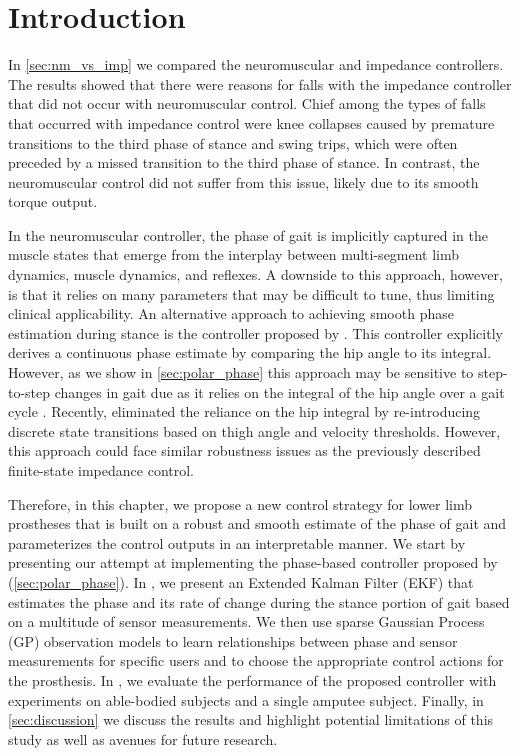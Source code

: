 \section{Introduction}

In \cref{sec:nm_vs_imp} we compared the neuromuscular and impedance controllers.
The results showed that there were reasons for falls with the impedance
controller that did not occur with neuromuscular control. Chief among the types
of falls that occurred with impedance control were knee collapses caused by
premature transitions to the third phase of stance and swing trips, which were
often preceded by a missed transition to the third phase of stance. In contrast,
the neuromuscular control did not suffer from this issue, likely due to its
smooth torque output.

In the neuromuscular controller, the phase of gait is implicitly captured in the
muscle states that emerge from the interplay between multi-segment limb
dynamics, muscle dynamics, and reflexes. A downside to this approach, however,
is that it relies on many parameters that may be difficult to tune, thus
limiting clinical applicability. An alternative approach to achieving smooth
phase estimation during stance is the controller proposed by
\citet{quintero2016preliminary}. This controller explicitly derives a continuous
phase estimate by comparing the hip angle to its integral. However, as we show
in \cref{sec:polar_phase} this approach may be sensitive to step-to-step changes
in gait due as it relies on the integral of the hip angle over a gait cycle .
Recently, \citet{rezazadeh2018phase} eliminated the reliance on the hip integral
by re-introducing discrete state transitions based on thigh angle and velocity
thresholds. However, this approach could face similar robustness issues as the
previously described finite-state impedance control.

Therefore, in this chapter, we propose a new control strategy for lower limb
prostheses that is built on a robust and smooth estimate of the phase of gait
and parameterizes the control outputs in an interpretable manner. We start by
presenting our attempt at implementing the phase-based controller proposed by
\citet{quintero2016preliminary} (\cref{sec:polar_phase}). In ,
we present an Extended Kalman Filter (EKF) that estimates the phase and its rate
of change during the stance portion of gait based on a multitude of sensor
measurements.  We then use sparse Gaussian Process (GP) observation models to
learn relationships between phase and sensor measurements for specific users and
to choose the appropriate control actions for the prosthesis. In
, we evaluate the performance of the proposed controller with
experiments on able-bodied subjects and a single amputee subject. Finally, in
\cref{sec:discussion} we discuss the results and highlight potential limitations
of this study as well as avenues for future research.
